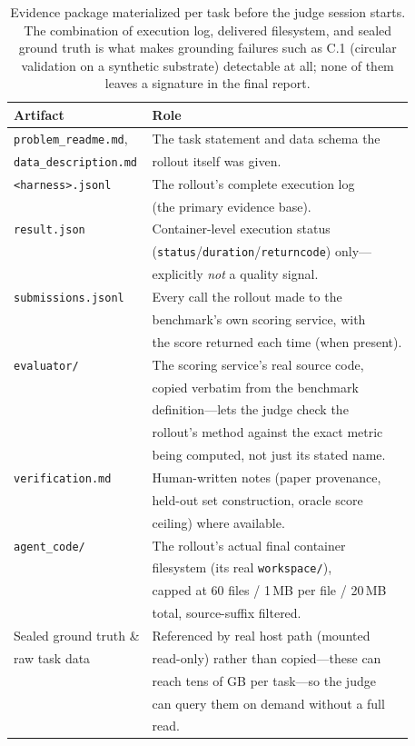 \begin{table}[h]
\centering
\small
\caption{Evidence package materialized per task before the judge session
starts. The combination of execution log, delivered filesystem, and sealed
ground truth is what makes grounding failures such as C.1 (circular
validation on a synthetic substrate) detectable at all; none of them leaves
a signature in the final report.}
\label{tab:evidence}
\begin{tabular}{ll}
\toprule
Artifact & Role \\
\midrule
\texttt{problem\_readme.md}, & The task statement and data schema the\\
\texttt{data\_description.md} & rollout itself was given. \\
\texttt{<harness>.jsonl} & The rollout's complete execution log\\
 & (the primary evidence base). \\
\texttt{result.json} & Container-level execution status\\
 & (\texttt{status}/\texttt{duration}/\texttt{returncode}) only---\\
 & explicitly \emph{not} a quality signal. \\
\texttt{submissions.jsonl} & Every call the rollout made to the\\
 & benchmark's own scoring service, with\\
 & the score returned each time (when present). \\
\texttt{evaluator/} & The scoring service's real source code,\\
 & copied verbatim from the benchmark\\
 & definition---lets the judge check the\\
 & rollout's method against the exact metric\\
 & being computed, not just its stated name. \\
\texttt{verification.md} & Human-written notes (paper provenance,\\
 & held-out set construction, oracle score\\
 & ceiling) where available. \\
\texttt{agent\_code/} & The rollout's actual final container\\
 & filesystem (its real \texttt{workspace/}),\\
 & capped at 60 files / 1\,MB per file / 20\,MB\\
 & total, source-suffix filtered. \\
Sealed ground truth \& & Referenced by real host path (mounted\\
raw task data & read-only) rather than copied---these can\\
 & reach tens of GB per task---so the judge\\
 & can query them on demand without a full\\
 & read. \\
\bottomrule
\end{tabular}

\end{table}

